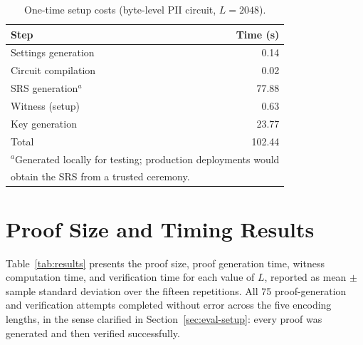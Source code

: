 \begin{table}[htbp]
\centering
\caption{One-time setup costs (byte-level PII circuit, $L = 2048$).}
\label{tab:setup-costs}
\vspace{2ex}
\begin{tabular}{l r}
\hline
\hline
Step & Time (s) \\
\hline
Settings generation & 0.14 \\
Circuit compilation & 0.02 \\
SRS generation$^{a}$ & 77.88 \\
Witness (setup) & 0.63 \\
Key generation & 23.77 \\
\hline
Total & 102.44 \\
\hline
\hline
\multicolumn{2}{l}{\footnotesize $^{a}$Generated locally for testing; production deployments would} \\
\multicolumn{2}{l}{\footnotesize obtain the SRS from a trusted ceremony.} \\
\end{tabular}
\end{table}

\section{Proof Size and Timing Results}
\label{sec:eval-results}

Table~\ref{tab:results} presents the proof size, proof generation time, witness computation time, and verification time for each value of $L$, reported as mean $\pm$ sample standard deviation over the fifteen repetitions. All 75 proof-generation and verification attempts completed without error across the five encoding lengths, in the sense clarified in Section~\ref{sec:eval-setup}: every proof was generated and then verified successfully.

\medskip

